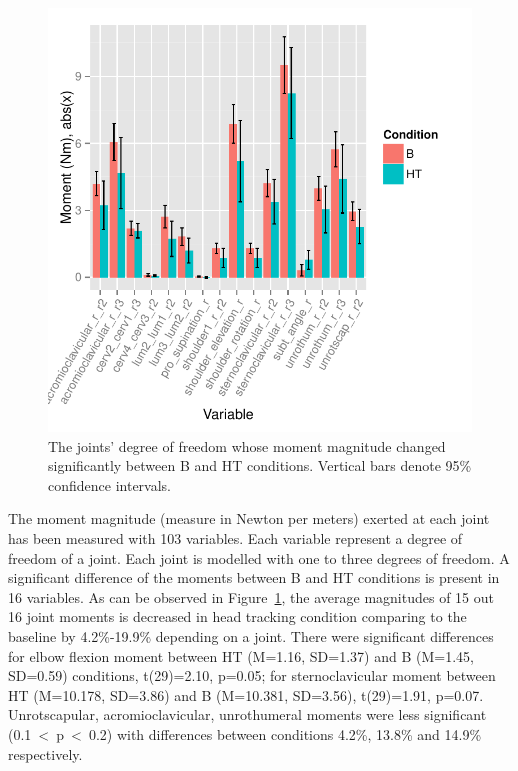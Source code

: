 \begin{figure}[tb]
\centering%
\includegraphics[width=\columnwidth]{img/Moments}%
\caption{The joints' degree of freedom whose moment magnitude changed significantly between B and HT conditions. Vertical bars denote 95\% confidence intervals.}%
\label{fig:moments}
\end{figure}

The moment magnitude (measure in Newton per meters) exerted at each joint has been measured with 103 variables. Each variable represent a degree of freedom of a joint. Each joint is modelled with one to three degrees of freedom.
A significant difference of the moments between B and HT conditions is present in 16 variables.
As can be observed in Figure~\ref{fig:moments}, the average magnitudes of 15 out 16 joint moments is decreased in head tracking condition comparing to the baseline by 4.2\%-19.9\% depending on a joint. There were significant differences for elbow flexion moment between HT (M=1.16, SD=1.37) and B (M=1.45, SD=0.59) conditions, t(29)=2.10, p=0.05; for sternoclavicular moment between HT (M=10.178, SD=3.86) and B (M=10.381, SD=3.56), t(29)=1.91, p=0.07. Unrotscapular, acromioclavicular, unrothumeral moments were less significant (0.1~\textless ~p~\textless~0.2) with differences between conditions 4.2\%, 13.8\% and 14.9\% respectively.

